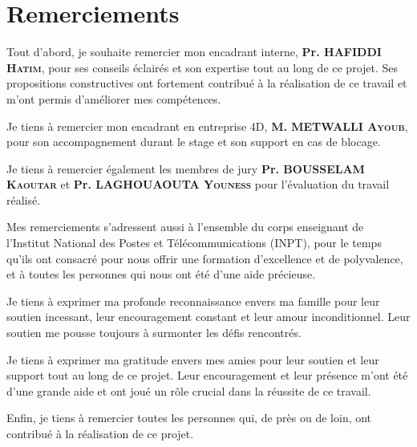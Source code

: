 \chapter*{Remerciements}

\begin{spacing}{1.25}


Tout d’abord, je souhaite remercier mon encadrant interne, \textbf{Pr. HAFIDDI \textsc{Hatim}}, pour ses conseils éclairés et son expertise tout au long de ce projet. Ses propositions constructives ont fortement contribué à la réalisation de ce travail et m’ont permis d’améliorer mes compétences.
\newline

Je tiens à remercier mon encadrant en entreprise 4D, \textbf{M. METWALLI \textsc{Ayoub}}, pour son accompagnement durant le stage et son support en cas de blocage. 
\newline

Je tiens à remercier également les membres de jury \textbf{Pr. BOUSSELAM \textsc{Kaoutar}} et \textbf{Pr. LAGHOUAOUTA \textsc{Youness}} pour l'évaluation du travail réalisé. 
\newline

Mes remerciements s'adressent aussi à l'ensemble du corps enseignant de l'Institut National des Postes et Télécommunications (INPT), pour le temps qu'ils ont consacré pour nous offrir une formation d'excellence et de polyvalence, et à toutes les personnes qui nous ont été d'une aide précieuse. 
\newline

Je tiens à exprimer ma profonde reconnaissance envers ma famille pour leur soutien incessant, leur encouragement constant et leur amour inconditionnel. Leur soutien me pousse toujours à surmonter les défis rencontrés.
\newline

Je tiens à exprimer ma gratitude envers mes amies pour leur soutien et leur support tout au long de ce projet. Leur encouragement et leur présence m'ont été d'une grande aide et ont joué un rôle crucial dans la réussite de ce travail.
\newline

Enfin, je tiens à remercier toutes les personnes qui, de près ou de loin, ont contribué à la réalisation de ce projet. 
\newline

\end{spacing}